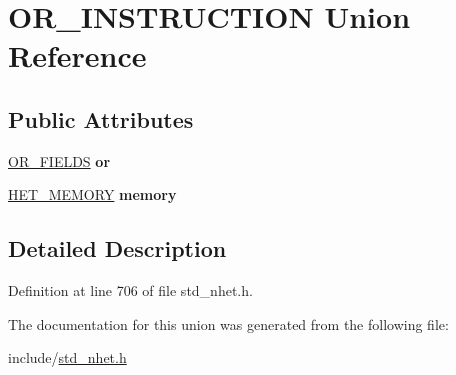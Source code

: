 \hypertarget{unionOR__INSTRUCTION}{}\section{O\+R\+\_\+\+I\+N\+S\+T\+R\+U\+C\+T\+I\+ON Union Reference}
\label{unionOR__INSTRUCTION}
\subsection*{Public Attributes}
\begin{DoxyCompactItemize}
\item 
\mbox{\label{unionOR__INSTRUCTION_a5fa3558c1a8ac3047d327c7bd97f6bc4}} 
\mbox{\hyperlink{structOR__format}{O\+R\+\_\+\+F\+I\+E\+L\+DS}} {\bfseries or}
\item 
\mbox{\label{unionOR__INSTRUCTION_a1fffd8016355e6c994cc8c2509d3a272}} 
\mbox{\hyperlink{structmemory__format}{H\+E\+T\+\_\+\+M\+E\+M\+O\+RY}} {\bfseries memory}
\end{DoxyCompactItemize}


\subsection{Detailed Description}


Definition at line 706 of file std\+\_\+nhet.\+h.



The documentation for this union was generated from the following file\+:\begin{DoxyCompactItemize}
\item 
include/\mbox{\hyperlink{std__nhet_8h}{std\+\_\+nhet.\+h}}\end{DoxyCompactItemize}
